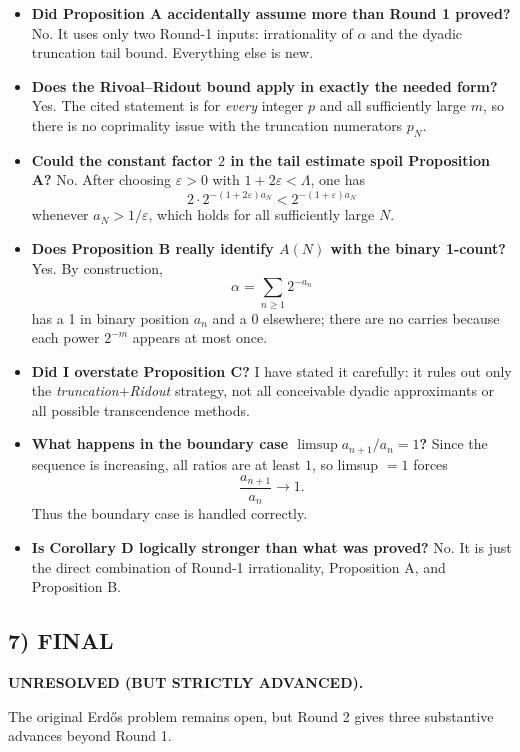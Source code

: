 \begin{itemize}
\item \textbf{Did Proposition A accidentally assume more than Round 1 proved?}
No. It uses only two Round-1 inputs: irrationality of $\alpha$ and the dyadic truncation tail bound. Everything else is new.

\item \textbf{Does the Rivoal--Ridout bound apply in exactly the needed form?}
Yes. The cited statement is for \emph{every} integer $p$ and all sufficiently large $m$, so there is no coprimality issue with the truncation numerators $p_N$.

\item \textbf{Could the constant factor $2$ in the tail estimate spoil Proposition A?}
No. After choosing $\varepsilon>0$ with $1+2\varepsilon<\Lambda$, one has
\[
2\cdot 2^{-(1+2\varepsilon)a_N}<2^{-(1+\varepsilon)a_N}
\]
whenever $a_N>1/\varepsilon$, which holds for all sufficiently large $N$.

\item \textbf{Does Proposition B really identify $A(N)$ with the binary 1-count?}
Yes. By construction,
\[
\alpha=\sum_{n\ge 1}2^{-a_n}
\]
has a 1 in binary position $a_n$ and a 0 elsewhere; there are no carries because each power $2^{-m}$ appears at most once.

\item \textbf{Did I overstate Proposition C?}
I have stated it carefully: it rules out only the \emph{truncation$+$Ridout} strategy, not all conceivable dyadic approximants or all possible transcendence methods.

\item \textbf{What happens in the boundary case $\limsup a_{n+1}/a_n=1$?}
Since the sequence is increasing, all ratios are at least $1$, so limsup $=1$ forces
\[
\frac{a_{n+1}}{a_n}\to 1.
\]
Thus the boundary case is handled correctly.

\item \textbf{Is Corollary D logically stronger than what was proved?}
No. It is just the direct combination of Round-1 irrationality, Proposition A, and Proposition B.
\end{itemize}

\subsection*{7) FINAL}
\textbf{UNRESOLVED (BUT STRICTLY ADVANCED).}

The original Erd\H{o}s problem remains open, but Round 2 gives three substantive advances beyond Round 1.

